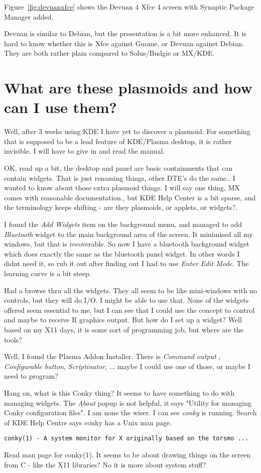 \documentclass{article}  %
\begin{document}
Figure~\ref{fig:devuanxfce} shows the Devuan 4 Xfce 4  screen with Synaptic Package Manager added. 

Devuan is similar to Debian, but the presentation is a bit more enhanced. It is hard to know whether this is Xfce against Gnome, or Devuan against Debian. They are both rather plain compared to Solus/Budgie or MX/KDE.


\clearpage
\section{What are these plasmoids and how can I use them?}
Well, after 3 weeks using KDE I have yet to discover a plasmoid. For something that is supposed to be a lead feature of KDE/Plasma desktop, it is rather invisible.  I will have to give in and read the manual.

OK, read up a bit,  the desktop and panel are basic containments that can contain widgets.  That is just renaming things, other DTE's do the same.. I wanted to know about those extra plasmoid things.  I will say one thing, MX comes with reasonable documentation., but KDE Help Center is a bit sparse, and the terminology keeps shifting - are they plasmoids, or applets, or widgets?.

I found the {\em Add Widgets} item on the background menu, and managed to add  {\em Bluetooth} widget to the main background area of the screen. It minimised all my windows, but that is recoverable. So now I have a bluetooth background widget which does exactly the same as the bluetooth panel widget. In other words I didnt need it, so rub it out after finding out I had to use {\em Enter Edit Mode}.  The learning curve is a bit steep.

 Had a browse thru all the widgets. They all seem to be like mini-windows with no controls, but they will do I/O. I might be able to use that.  None of the widgets offered seem essential to me, but I can see that I could use the concept to control and maybe to receive R graphics output. But how do I set up a widget? Well based on my X11 days, it is some sort of programming job, but where are the tools? 

Well, I found the Plasma Addon Installer. There is {\em Command output} , {\em Configurable button},  {\em Scriptinator},  ...  maybe I could use one of those, or maybe I need to program?

Hang on, what is this Conky thing? It seems to have something to do with managing widgets. The {\em About} popup is not helpful, it says "Utility for managing Conky configuration files". I am none the wiser.  I can see {\em conky} is running.  Search of KDE Help Centre says conky has a Unix man page. 
\begin{verbatim}
conky(1) - A system monitor for X originally based on the torsmo ...
\end{verbatim}
Read man page for conky(1). It seems to be about drawing things on the screen from C - like the X11 libraries?  No it is more about system stuff?
\end{document}
